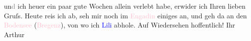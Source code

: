                   un\textcolor{gray}{d} ich \introOben{}heuer\introOben{} ein paar gute Wochen
               allein verlebt habe, {\pb}erwider ich Ihren lieben Gruſs.
               Heute reis ich ab, seh mir noch im \textcolor{pink}{Engadin}{}\ledrightnote{\textcolor{pink}{Engadin}} einiges
               an, und geh da{\geminationn} an den \textcolor{pink}{Bodensee}{}\ledrightnote{\textcolor{pink}{Bodensee}} (\textcolor{pink}{Bregenz}{}\ledrightnote{\textcolor{pink}{Bregenz}}), von wo ich \textcolor{blue}{Lili}{}\ledrightnote{\textcolor{blue}{Lili Schnitzler}} abhole. Auf Wiedersehen hoffentlich! \pend
           \pstart Ihr \spacefill\mbox{Arthur}\pend{}\endnumbering{}  
      